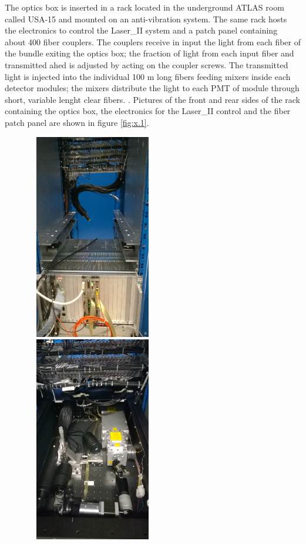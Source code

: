 The optics box is inserted in a rack located in the underground ATLAS room called
USA-15 and mounted on an anti-vibration system. 
The same rack hosts the electronics 
to control the Laser\_II system and a patch panel containing about 400 fiber
couplers. The couplers receive in input the light from each fiber of the bundle
exiting the optics box; the fraction of light from each input fiber and transmitted
ahed is adjusted by acting on the coupler screws. The transmitted light is injected
into the individual 100 m long fibers feeding mixers inside each detector modules;
the mixers distribute the light to each PMT of module through short, variable lenght
clear fibers. . Pictures of the front and rear sides of the rack containing the
optics box, the electronics for the Laser\_II 
control and the fiber patch panel are shown in figure \ref{fig:x.1}.
% 
\begin{figure}[htb]
\begin{center} 
\includegraphics[width=5.8cm, height=9cm]{figures/WP_20141009_15_37_36_Pro}
\includegraphics[width=5.8cm, height=9cm]{figures/WP_20141009_16_17_31_Pro}

\end{center}
\end{figure}
